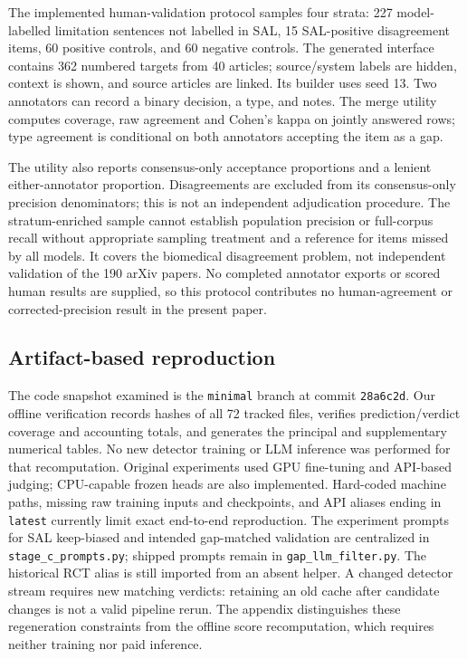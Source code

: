 The implemented human-validation protocol samples four strata: 227 model-labelled limitation
sentences not labelled in SAL, 15 SAL-positive disagreement items, 60 positive controls, and
60 negative controls. The generated interface contains 362 numbered targets from 40 articles;
source/system labels are hidden, context is shown, and source articles are linked. Its builder
uses seed 13. Two annotators can record a binary decision, a type, and notes. The merge utility
computes coverage, raw agreement and Cohen's kappa on jointly answered rows; type agreement
is conditional on both annotators accepting the item as a gap.

The utility also reports consensus-only acceptance proportions and a lenient either-annotator
proportion. Disagreements are excluded from its consensus-only precision denominators; this is
not an independent adjudication procedure. The stratum-enriched sample cannot establish
population precision or full-corpus recall without appropriate sampling treatment and a
reference for items missed by all models. It covers the biomedical disagreement problem,
not independent validation of the 190 arXiv papers. No completed annotator exports or scored
human results are supplied, so this protocol contributes no human-agreement or corrected-precision
result in the present paper.

\subsection{Artifact-based reproduction}
\label{S:reproducibility}

The code snapshot examined is the \texttt{minimal} branch at commit \texttt{28a6c2d}. Our offline
verification records hashes of all 72 tracked files, verifies prediction/verdict coverage and
accounting totals, and generates the principal and supplementary numerical tables. No new detector training or LLM inference was performed
for that recomputation. Original experiments used GPU fine-tuning and API-based judging; CPU-capable
frozen heads are also implemented. Hard-coded machine paths, missing raw training inputs and
checkpoints, and API aliases ending in \texttt{latest} currently limit exact end-to-end reproduction.
The experiment prompts for SAL keep-biased and intended gap-matched validation are centralized
in \texttt{stage\_c\_prompts.py}; shipped prompts remain in \texttt{gap\_llm\_filter.py}.
The historical RCT alias is still imported from an absent helper. A changed detector stream
requires new matching verdicts: retaining an old cache after candidate changes is not a valid
pipeline rerun. The appendix distinguishes these regeneration constraints from the offline
score recomputation, which requires neither training nor paid inference.


